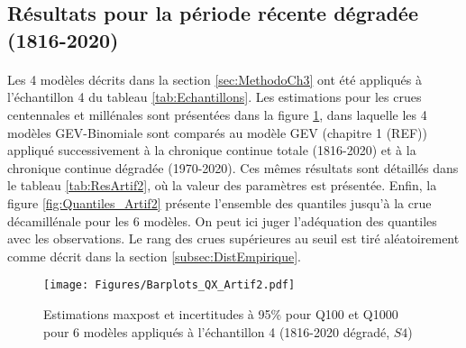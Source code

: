 \documentclass[11pt]{article}
\begin{document}
	\FloatBarrier	
	
	\subsection{Résultats pour la période récente dégradée (1816-2020)}
	\label{subsec:ResultsArtif}
	
	\paragraph{} 
	Les 4 modèles décrits dans la section \ref{sec:MethodoCh3} ont été appliqués à l'échantillon 4 du tableau \ref{tab:Echantillons}. Les estimations pour les crues centennales et millénales sont présentées dans la figure \ref{fig:Barplot_Artif2}, dans laquelle les 4 modèles GEV-Binomiale sont comparés au modèle GEV (chapitre 1 (REF)) appliqué successivement à la chronique continue totale (1816-2020) et à la chronique continue dégradée (1970-2020). Ces mêmes résultats sont détaillés dans le tableau \ref{tab:ResArtif2}, où la valeur des paramètres est présentée. Enfin, la figure \ref{fig:Quantiles_Artif2} présente l'ensemble des quantiles jusqu'à la crue décamillénale pour les 6 modèles. On peut ici juger l'adéquation des quantiles avec les observations. Le rang des crues supérieures au seuil est tiré aléatoirement comme décrit dans la section \ref{subsec:DistEmpirique}. 	
	
	\begin{figure}[h]
		\centering
		\texttt{[image: Figures/Barplots\_QX\_Artif2.pdf]}	
		\caption{Estimations maxpost et incertitudes à 95\% pour Q100 et Q1000 pour 6 modèles appliqués à l'échantillon 4 (1816-2020 dégradé, $S4$)}
		\label{fig:Barplot_Artif2}
	\end{figure}
\end{document}
